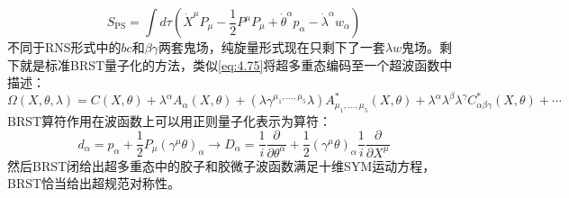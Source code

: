 \begin{equation}
	\label{eq:5.17}
	S_{\mathrm{PS}}=\int d\tau\left(\dot{X}^\mu P_\mu-\frac{1}{2}P^\mu P_\mu+\dot{\theta}^\alpha p_\alpha-\dot{\lambda}^\alpha w_\alpha\right)
\end{equation}
不同于RNS形式中的$bc$和$\beta\gamma$两套鬼场，纯旋量形式现在只剩下了一套$\lambda w$鬼场。剩下就是标准BRST量子化的方法，类似\ref{eq:4.75}将超多重态编码至一个超波函数中描述：
\begin{equation}
	\Omega(X,\theta,\lambda)=C(X,\theta)+\lambda^\alpha A_\alpha(X,\theta)+(\lambda\gamma^{\mu_1,\ldots,\mu_5}\lambda)A_{\mu_1,\ldots,\mu_5}^*(X,\theta)+\lambda^\alpha\lambda^\beta\lambda^\gamma C_{\alpha\beta\gamma}^*(X,\theta)+\cdots
\end{equation}
BRST算符作用在波函数上可以用正则量子化表示为算符：
\begin{equation}
	\label{eq:5.19}
	d_\alpha=p_\alpha+\frac{1}{2}P_\mu(\gamma^\mu\theta)_\alpha\to D_\alpha=\frac1i\frac{\partial}{\partial\theta^\alpha}+\frac{1}{2}(\gamma^\mu\theta)_\alpha\frac1i\frac{\partial}{\partial X^\mu}
\end{equation}
然后BRST闭给出超多重态中的胶子和胶微子波函数满足十维SYM运动方程，BRST恰当给出超规范对称性。
